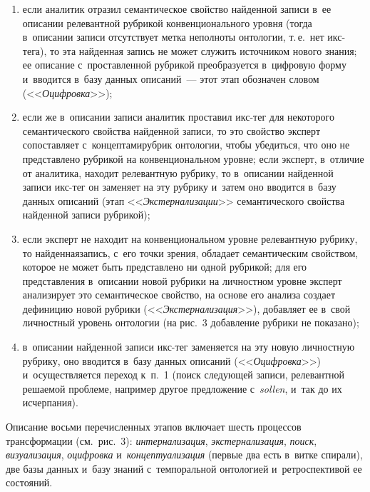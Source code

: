 {\begin{multicols}{2}
\begin{enumerate}[(1)]
\item если аналитик отразил семантическое свойство найденной записи в~ее 
описании релевантной рубрикой конвенционального уровня (тогда 
в~описании записи отсутствует метка неполноты онтологии, т.\,е.\ нет  
икс-те\-га), то эта найденная запись не может служить источником нового знания; 
ее описание с~про\-став\-лен\-ной рубрикой преобразуется в~цифровую форму 
и~вводится в~базу данных описаний~--- этот этап обозначен словом 
(<<\textit{Оцифровка}>>);
\item если же в~описании записи аналитик проставил икс-тег для некоторого 
семантического свойства найденной записи, то это свойство эксперт 
сопоставляет с~концептами\linebreak рубрик онтологии, чтобы убедиться, что оно не 
пред\-став\-ле\-но рубрикой на конвенциональном уровне; если эксперт, 
в~отличие от аналитика, находит релевантную рубрику, то в~описании 
найденной записи икс-тег он заменяет на эту рубрику и~затем оно вводится 
в~базу данных описаний (этап <<\textit{Экстернализации}>> семантического 
свойства найденной записи рубрикой);
\item если эксперт не находит на конвенциональном уровне релевантную 
рубрику, то найденная\linebreak запись, с~его точки зрения, обладает семантическим 
свойством, которое не может быть представлено ни одной руб\-ри\-кой; для его 
пред\-став\-ле\-ния в~описании новой руб\-ри\-ки на личностном уровне эксперт 
анализирует это семантическое свойство, на основе его анализа создает 
дефиницию новой рубрики (<<\textit{Экстернализация}>>), добавляет ее 
в~свой личностный уровень онтологии (на рис.~3 добавление руб\-ри\-ки не 
показано);
\item в~описании найденной записи икс-тег заменяется на эту новую 
личностную руб\-ри\-ку, оно вводится в~базу данных описаний 
(<<\textit{Оцифровка}>>) и~осуществляется переход к~п.~1 (поиск 
следующей записи, релевантной решаемой проблеме, например другое 
предложение с~\textit{sollen}, и~так до их исчерпания).
    \end{enumerate}
    
    Описание восьми перечисленных этапов включает шесть процессов 
трансформации (см.\ рис.~3): \textit{интернализация}, \textit{экстернализация}, 
\textit{поиск}, \textit{визуализация}, \textit{оцифровка} 
и~\textit{концептуализация} (первые два есть в~витке спирали), две базы 
данных и~базу знаний с~темпоральной онтологией и~ретроспективой ее 
состояний.
    

\end{multicols}}
